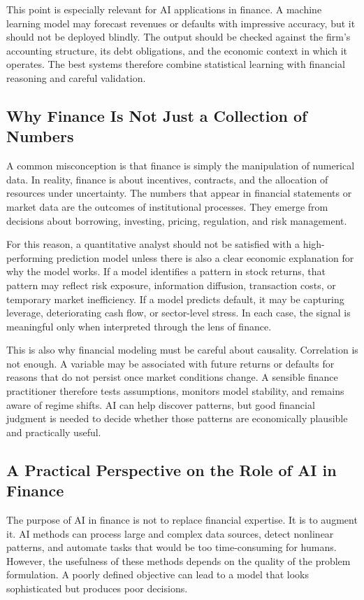 \documentclass[../ai_in_finance]{subfiles}
\begin{document}
This point is especially relevant for AI applications in finance. A machine learning model may forecast revenues or defaults with impressive accuracy, but it should not be deployed blindly. The output should be checked against the firm's accounting structure, its debt obligations, and the economic context in which it operates. The best systems therefore combine statistical learning with financial reasoning and careful validation.

\subsection{Why Finance Is Not Just a Collection of Numbers}

A common misconception is that finance is simply the manipulation of numerical data. In reality, finance is about incentives, contracts, and the allocation of resources under uncertainty. The numbers that appear in financial statements or market data are the outcomes of institutional processes. They emerge from decisions about borrowing, investing, pricing, regulation, and risk management.

For this reason, a quantitative analyst should not be satisfied with a high-performing prediction model unless there is also a clear economic explanation for why the model works. If a model identifies a pattern in stock returns, that pattern may reflect risk exposure, information diffusion, transaction costs, or temporary market inefficiency. If a model predicts default, it may be capturing leverage, deteriorating cash flow, or sector-level stress. In each case, the signal is meaningful only when interpreted through the lens of finance.

This is also why financial modeling must be careful about causality. Correlation is not enough. A variable may be associated with future returns or defaults for reasons that do not persist once market conditions change. A sensible finance practitioner therefore tests assumptions, monitors model stability, and remains aware of regime shifts. AI can help discover patterns, but good financial judgment is needed to decide whether those patterns are economically plausible and practically useful.

\subsection{A Practical Perspective on the Role of AI in Finance}

The purpose of AI in finance is not to replace financial expertise. It is to augment it. AI methods can process large and complex data sources, detect nonlinear patterns, and automate tasks that would be too time-consuming for humans. However, the usefulness of these methods depends on the quality of the problem formulation. A poorly defined objective can lead to a model that looks sophisticated but produces poor decisions.
\end{document}

